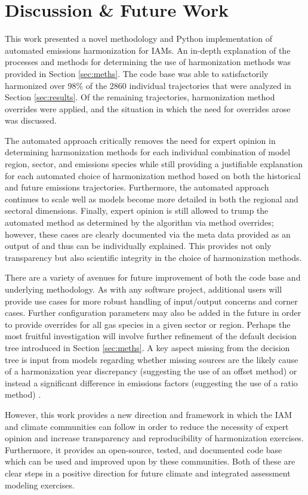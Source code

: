 \section{Discussion \& Future Work}\label{sec:future}

This work presented a novel methodology and Python implementation of automated
emissions harmonization for IAMs. An in-depth explanation of the processes and
methods for determining the use of harmonization methods was provided in Section
\ref{sec:meths}. The  code base was able to satisfactorily
harmonized over 98\% of the 2860 individual trajectories that were analyzed in
Section \ref{sec:results}. Of the remaining trajectories, harmonization method
overrides were applied, and the situation in which the need for overrides arose
was discussed.

The automated approach critically removes the need for expert opinion in
determining harmonization methods for each individual combination of model
region, sector, and emissions species while still providing a justifiable
explanation for each automated choice of harmonization method based on both the
historical and future emissions trajectories. Furthermore, the automated
approach continues to scale well as models become more detailed in both the
regional and sectoral dimensions. Finally, expert opinion is still allowed to
trump the automated method as determined by the algorithm via method overrides;
however, these cases are clearly documented via the meta data provided as an
output of  and thus can be individually explained. This provides
not only transparency but also scientific integrity in the choice of
harmonization methods.

There are a variety of avenues for future improvement of both the 
code base and underlying methodology. As with any software project, additional
users will provide use cases for more robust handling of input/output concerns
and corner cases. Further configuration parameters may also be added in the
future in order to provide overrides for all gas species in a given sector or
region. Perhaps the most fruitful investigation will involve further refinement
of the default decision tree introduced in Section \ref{sec:meths}. A key aspect
missing from the decision tree is input from models regarding whether missing
sources are the likely cause of a harmonization year discrepancy (suggesting the
use of an offset method) or instead a significant difference in emissions
factors (suggesting the use of a ratio method) \cite{rogelj_discrepancies_2011}.

However, this work provides a new direction and framework in which the IAM and
climate communities can follow in order to reduce the necessity of expert
opinion and increase transparency and reproducibility of harmonization
exercises. Furthermore, it provides an open-source, tested, and documented code
base which can be used and improved upon by these communities. Both of these are
clear steps in a positive direction for future climate and integrated assessment
modeling exercises.
